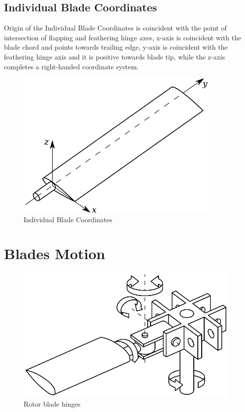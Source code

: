 \subsection{Individual Blade Coordinates}

Origin of the Individual Blade Coordinates is coincident with the point of intersection of flapping and feathering hinge axes, x-axis is coincident with the blade chord and points towards trailing edge, y-axis is coincident with the feathering hinge axis and it is positive towards blade tip, while the z-axis completes a right-handed coordinate system.

\begin{figure}[h!]
  \centering
  \includegraphics[width=100mm]{images/coordinate_system_IBC.eps}
  \caption{Individual Blade Coordinates}
\end{figure}

\section{Blades Motion}

\begin{figure}[h!]
  \centering
  \includegraphics[width=110mm]{images/rotor_hub_hinges.eps}
  \caption{Rotor blade hinges}
\end{figure}

